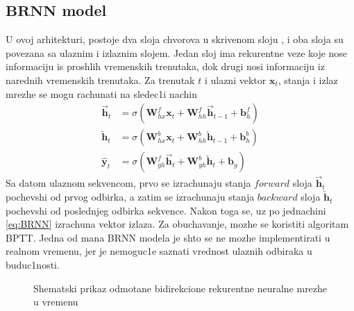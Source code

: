 \documentclass[a4paper, openany, oneside, 11pt]{book}
\begin{document}
\subsection[$BRNN$ model]{$\mathbf{BRNN}$ model}
U ovoj arhitekturi, postoje dva sloja chvorova u skrivenom sloju , i oba sloja su povezana sa ulaznim i izlaznim slojem. Jedan sloj ima rekurentne veze koje nose informaciju is proshlih vremenskih trenutaka, dok drugi nosi informaciju iz narednih vremenskih trenutaka. Za trenutak $t$ i ulazni vektor $\mathbf{x}_{t}$, stanja i izlaz mrezhe se mogu rachunati na sledec1i nachin
\begin{align}
\overrightarrow{\mathbf{h}}_t &= \sigma\left(\mathbf{W}^f_{hx}\mathbf{x}_t+\mathbf{W}^f_{hh}\overrightarrow{\mathbf{h}}_{t-1}+\mathbf{b}_h^f\right)\\
\overleftarrow{\mathbf{h}}_t &= \sigma\left(\mathbf{W}^b_{hx}\mathbf{x}_t+\mathbf{W}^b_{hh}\overleftarrow{\mathbf{h}}_{t-1}+\mathbf{b}_h^b\right)\\
\mathbf{\hat{y}}_t&= \sigma\left(\mathbf{W}^f_{yh}\overrightarrow{\mathbf{h}}_t +\mathbf{W}^b_{yh}\overleftarrow{\mathbf{h}}_t+\mathbf{b}_y\right) \label{eq:BRNN}
\end{align}
Sa datom ulaznom sekvencom, prvo se izrachunaju stanja $forward$ sloja $\overrightarrow{\mathbf{h}}_t$ pochevshi od prvog odbirka, a zatim se izrachunaju stanja $backward$ sloja $\overleftarrow{\mathbf{h}}_t$ pochevshi od poslednjeg odbirka sekvence. Nakon toga se, uz po jednachini \ref{eq:BRNN} izrachuna vektor izlaza. Za obuchavanje, mozhe se koristiti algoritam \acrshort{BPTT}. Jedna od mana \acrshort{BRNN} modela je shto se ne mozhe implementirati u realnom vremenu, jer je nemoguc1e saznati vrednost ulaznih odbiraka u buduc1nosti.
\newpage
\begin{figure}[!h]
\hspace*{0.2\linewidth}
\caption{Shemat\-ski prikaz odmotane bidirekcione rekurentne neuralne mre\-zhe u vremenu}
\label{fig:12}
\end{figure}
\end{document}

